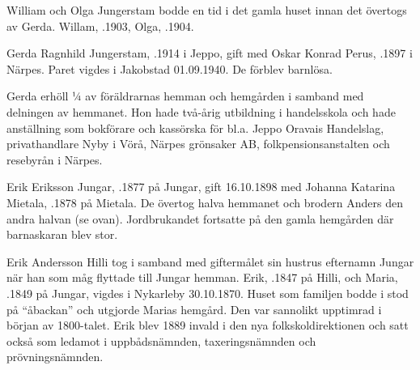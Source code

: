 William och Olga Jungerstam bodde en tid i det gamla huset innan det övertogs av Gerda. Willam, .1903, Olga, .1904.



Gerda Ragnhild Jungerstam, .1914 i Jeppo, gift med Oskar Konrad Perus, .1897 i Närpes. Paret vigdes i Jakobstad 01.09.1940. De förblev barnlösa.

Gerda erhöll ¼ av föräldrarnas hemman och hemgården i samband med delningen av hemmanet. Hon hade två-årig utbildning i handelsskola och hade anställning som bokförare och kassörska för bl.a. Jeppo Oravais Handelslag, privathandlare Nyby i Vörå, Närpes grönsaker AB, folkpensionsanstalten och resebyrån i Närpes.


Erik Eriksson Jungar, .1877 på Jungar, gift 16.10.1898 med Johanna Katarina Mietala, .1878 på Mietala. De övertog halva hemmanet och brodern Anders den andra halvan (se ovan). Jordbrukandet fortsatte på den gamla hemgården där barnaskaran blev stor.
\begin{jhchildren}
  \item {}
  \item {}
  \item {}
  \item {}
  \item {}
  \item {}
  \item {}
  \item {}
  \item {}
  \item {}
\end{jhchildren}


Erik Andersson Hilli tog i samband med giftermålet sin hustrus efternamn Jungar när han som måg flyttade till Jungar hemman. Erik, .1847 på Hilli, och Maria, .1849 på Jungar, vigdes i Nykarleby 30.10.1870. Huset som familjen bodde i stod på ``åbackan'' och utgjorde Marias hemgård. Den var sannolikt upptimrad i början av 1800-talet. Erik blev 1889 invald i den nya folkskoldirektionen och satt också som ledamot i uppbådsnämnden, taxeringsnämnden och prövningsnämnden.


